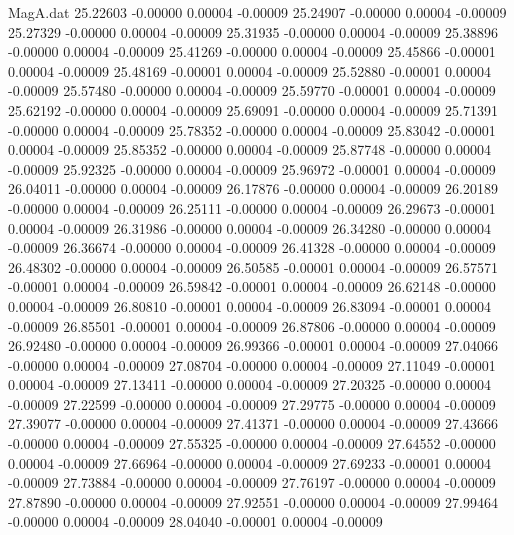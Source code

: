 \begin{filecontents}{MagA.dat}
  25.22603   -0.00000    0.00004   -0.00009
  25.24907   -0.00000    0.00004   -0.00009
  25.27329   -0.00000    0.00004   -0.00009
  25.31935   -0.00000    0.00004   -0.00009
  25.38896   -0.00000    0.00004   -0.00009
  25.41269   -0.00000    0.00004   -0.00009
  25.45866   -0.00001    0.00004   -0.00009
  25.48169   -0.00001    0.00004   -0.00009
  25.52880   -0.00001    0.00004   -0.00009
  25.57480   -0.00000    0.00004   -0.00009
  25.59770   -0.00001    0.00004   -0.00009
  25.62192   -0.00000    0.00004   -0.00009
  25.69091   -0.00000    0.00004   -0.00009
  25.71391   -0.00000    0.00004   -0.00009
  25.78352   -0.00000    0.00004   -0.00009
  25.83042   -0.00001    0.00004   -0.00009
  25.85352   -0.00000    0.00004   -0.00009
  25.87748   -0.00000    0.00004   -0.00009
  25.92325   -0.00000    0.00004   -0.00009
  25.96972   -0.00001    0.00004   -0.00009
  26.04011   -0.00000    0.00004   -0.00009
  26.17876   -0.00000    0.00004   -0.00009
  26.20189   -0.00000    0.00004   -0.00009
  26.25111   -0.00000    0.00004   -0.00009
  26.29673   -0.00001    0.00004   -0.00009
  26.31986   -0.00000    0.00004   -0.00009
  26.34280   -0.00000    0.00004   -0.00009
  26.36674   -0.00000    0.00004   -0.00009
  26.41328   -0.00000    0.00004   -0.00009
  26.48302   -0.00000    0.00004   -0.00009
  26.50585   -0.00001    0.00004   -0.00009
  26.57571   -0.00001    0.00004   -0.00009
  26.59842   -0.00001    0.00004   -0.00009
  26.62148   -0.00000    0.00004   -0.00009
  26.80810   -0.00001    0.00004   -0.00009
  26.83094   -0.00001    0.00004   -0.00009
  26.85501   -0.00001    0.00004   -0.00009
  26.87806   -0.00000    0.00004   -0.00009
  26.92480   -0.00000    0.00004   -0.00009
  26.99366   -0.00001    0.00004   -0.00009
  27.04066   -0.00000    0.00004   -0.00009
  27.08704   -0.00000    0.00004   -0.00009
  27.11049   -0.00001    0.00004   -0.00009
  27.13411   -0.00000    0.00004   -0.00009
  27.20325   -0.00000    0.00004   -0.00009
  27.22599   -0.00000    0.00004   -0.00009
  27.29775   -0.00000    0.00004   -0.00009
  27.39077   -0.00000    0.00004   -0.00009
  27.41371   -0.00000    0.00004   -0.00009
  27.43666   -0.00000    0.00004   -0.00009
  27.55325   -0.00000    0.00004   -0.00009
  27.64552   -0.00000    0.00004   -0.00009
  27.66964   -0.00000    0.00004   -0.00009
  27.69233   -0.00001    0.00004   -0.00009
  27.73884   -0.00000    0.00004   -0.00009
  27.76197   -0.00000    0.00004   -0.00009
  27.87890   -0.00000    0.00004   -0.00009
  27.92551   -0.00000    0.00004   -0.00009
  27.99464   -0.00000    0.00004   -0.00009
  28.04040   -0.00001    0.00004   -0.00009

\end{filecontents}
